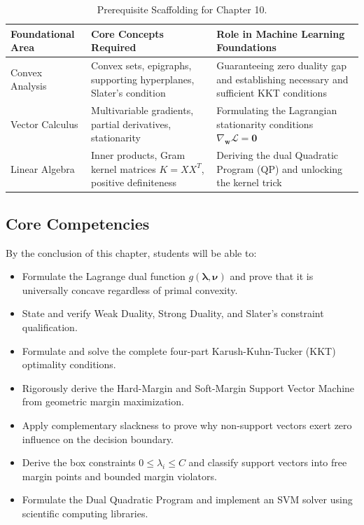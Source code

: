 \begin{table}[htbp]
\centering
\small
\begin{tabularx}{\textwidth}{lXX}
\toprule
\textbf{Foundational Area} & \textbf{Core Concepts Required} & \textbf{Role in Machine Learning Foundations} \\
\midrule
Convex Analysis & Convex sets, epigraphs, supporting hyperplanes, Slater's condition & Guaranteeing zero duality gap and establishing necessary and sufficient KKT conditions \\
\addlinespace
Vector Calculus & Multivariable gradients, partial derivatives, stationarity & Formulating the Lagrangian stationarity conditions $\nabla_{\mathbf{w}}\mathcal{L} = \mathbf{0}$ \\
\addlinespace
Linear Algebra & Inner products, Gram kernel matrices $K = X X^T$, positive definiteness & Deriving the dual Quadratic Program (QP) and unlocking the kernel trick \\
\bottomrule
\end{tabularx}
\caption{Prerequisite Scaffolding for Chapter 10.}
\label{tab:w10_prereqs}
\end{table}

\subsection{Core Competencies}
By the conclusion of this chapter, students will be able to:
\begin{itemize}
    \item Formulate the Lagrange dual function $g(\boldsymbol{\lambda}, \boldsymbol{\nu})$ and prove that it is universally concave regardless of primal convexity.
    \item State and verify Weak Duality, Strong Duality, and Slater's constraint qualification.
    \item Formulate and solve the complete four-part Karush-Kuhn-Tucker (KKT) optimality conditions.
    \item Rigorously derive the Hard-Margin and Soft-Margin Support Vector Machine from geometric margin maximization.
    \item Apply complementary slackness to prove why non-support vectors exert zero influence on the decision boundary.
    \item Derive the box constraints $0 \le \lambda_i \le C$ and classify support vectors into free margin points and bounded margin violators.
    \item Formulate the Dual Quadratic Program and implement an SVM solver using scientific computing libraries.
\end{itemize}

